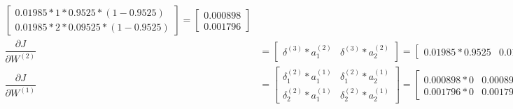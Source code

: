 \documentclass[12pt]{article}
\begin{document}
\begin{enumerate}
\begin{align*}
			\begin{bmatrix}
				0.01985*1*0.9525*(1-0.9525)\\
				0.01985*2*0.09525*(1-0.9525)
			\end{bmatrix}
			=
			\begin{bmatrix}
				0.000898\\
				0.001796
			\end{bmatrix}\\
		\dfrac{\partial J}{\partial W^{(2)}} &=
			\begin{bmatrix}
				\delta^{(3)} * a_1^{(2)} & \delta^{(3)}*a_2^{(2)}
			\end{bmatrix}
			=
			\begin{bmatrix}
				0.01985 * 0.9525 & 0.01985 * 0.09525
			\end{bmatrix}
			=
			\begin{bmatrix}
				0.01891 & 0.01891
			\end{bmatrix}\\
		\dfrac{\partial J}{\partial W^{(1)}} &= 
			\begin{bmatrix}
				\delta_1^{(2)} * a_1^{(1)} & \delta_1^{(2)} * a_2^{(1)}\\
				\delta_2^{(2)} * a_1^{(1)} & \delta_2^{(2)} * a_2^{(1)}
			\end{bmatrix}
			=
			\begin{bmatrix}
				0.000898 * 0 & 0.000898 * 1\\
				0.001796 * 0 & 0.001796*1
			\end{bmatrix}
			=
			\begin{bmatrix}
				0 & 0.000898\\
				0 & 0.001796
			\end{bmatrix}
	\end{align*}


\end{enumerate}
\end{document}
